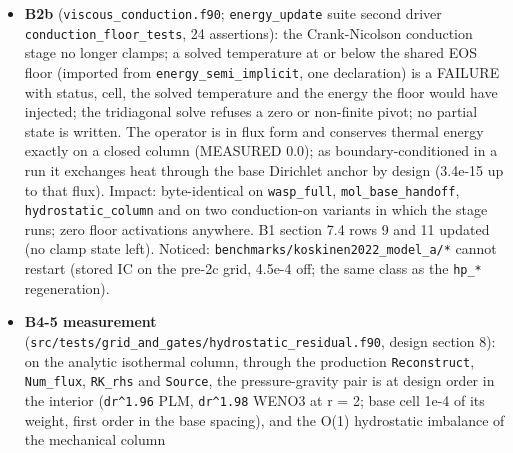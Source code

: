 \documentclass[english,a4paper]{my_memo}
\begin{document}
\begin{itemize}
  face-composition enthalpy (T-B4.5). The B4-2 pre-measurement
  (\texttt{src/utils/formation\_energy\_flux\_diagnostic.py}, section 7 of the design)
  stands as the size of that reservoir transport: on \texttt{wasp\_full\_newton} 28
  percent of the absorbed heating leaves the column as advected ionization
  energy (median 14 percent of the local heating, 52 percent at the
  ionization front at 1.23 Rp); the present energy face flux is \texttt{v\ (E\ +\ p)}
  with the caloric H2 internal energy already inside \texttt{E}, addressed by the
  owning cell (T-B4.5). Findings: \texttt{lower\_profile}\textquotesingle s golden mass flux is not
  flat (1.1e-2), so continuity-based diagnostics on it discriminate nothing
  until it is Newton-finished; \texttt{benchmarks/hd209/output} integrates to
  cooling 24 percent above heating on its saved state.
\item
  \textbf{B2b} (\texttt{viscous\_conduction.f90}; \texttt{energy\_update} suite second driver
  \texttt{conduction\_floor\_tests}, 24 assertions): the Crank-Nicolson conduction
  stage no longer clamps; a solved temperature at or below the shared EOS
  floor (imported from \texttt{energy\_semi\_implicit}, one declaration) is a FAILURE
  with status, cell, the solved temperature and the energy the floor would
  have injected; the tridiagonal solve refuses a zero or non-finite pivot;
  no partial state is written. The operator is in flux form and conserves
  thermal energy exactly on a closed column (MEASURED 0.0); as
  boundary-conditioned in a run it exchanges heat through the base Dirichlet
  anchor by design (3.4e-15 up to that flux). Impact: byte-identical on
  \texttt{wasp\_full}, \texttt{mol\_base\_handoff}, \texttt{hydrostatic\_column} and on two
  conduction-on variants in which the stage runs; zero floor activations
  anywhere. B1 section 7.4 rows 9 and 11 updated (no clamp state left).
  Noticed: \texttt{benchmarks/koskinen2022\_model\_a/*} cannot restart (stored IC on
  the pre-2c grid, 4.5e-4 off; the same class as the \texttt{hp\_*} regeneration).
\item
  \textbf{B4-5 measurement} (\texttt{src/tests/grid\_and\_gates/hydrostatic\_residual.f90},
  design section 8): on the analytic isothermal column, through the
  production \texttt{Reconstruct}, \texttt{Num\_flux}, \texttt{RK\_rhs} and \texttt{Source}, the
  pressure-gravity pair is at design order in the interior (\texttt{dr\^{}1.96} PLM,
  \texttt{dr\^{}1.98} WENO3 at r = 2; base cell 1e-4 of its weight, first order in the
  base spacing), and the O(1) hydrostatic imbalance of the mechanical column

\end{itemize}
\end{document}
